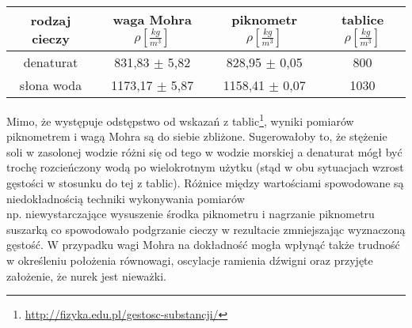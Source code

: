 \documentclass{article}
\begin{document}
\begin{center}
\begin{tabular}{ c | c | c | c }
rodzaj cieczy & waga Mohra  $\rho [\frac{kg}{m^3}]$ & piknometr $\rho [\frac{kg}{m^3}]$ & tablice $\rho [\frac{kg}{m^3}] $ \\

\hline
 denaturat  & 831,83 $\pm$ 5,82 &  828,95 $\pm$  0,05& 800\\  
 słona woda & 1173,17 $\pm$ 5,87&1158,41 $\pm$ 0,07 & 1030
\end{tabular}
\end{center}

Mimo, że występuje odstępstwo od wskazań z tablic\footnote{\url{http://fizyka.edu.pl/gestosc-substancji/}}, wyniki pomiarów piknometrem i wagą Mohra są do siebie zbliżone.  Sugerowałoby to,  że stężenie soli w zasolonej wodzie różni się od tego w wodzie morskiej a denaturat mógł być trochę rozcieńczony wodą po wielokrotnym użytku (stąd w obu sytuacjach wzrost gęstości w stosunku do tej z tablic).  Różnice między wartościami spowodowane są niedokładnością techniki wykonywania pomiarów \\ np.  niewystarczające wysuszenie środka piknometru i nagrzanie piknometru suszarką co spowodowało podgrzanie cieczy w rezultacie zmniejszając wyznaczoną gęstość.  W przypadku wagi Mohra na dokładność mogła wpłynąć także trudność w określeniu położenia równowagi, oscylacje ramienia dźwigni oraz przyjęte założenie, że nurek jest nieważki.
\end{document}
